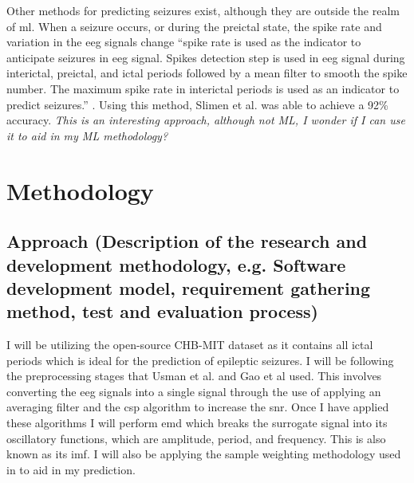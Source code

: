\documentclass[12pt]{article}
\begin{document}
Other methods for predicting seizures exist, although they are outside the realm of \acrshort{ml}. When a seizure occurs, or during the preictal state, the spike rate and variation in the \acrshort{eeg} signals change \cite{lange1983temporo} \cite{truccolo2011single} ``spike rate is used as the indicator to anticipate seizures in \acrfull{eeg} signal. Spikes detection step is used in \acrshort{eeg} signal during interictal, preictal, and ictal periods followed by a mean filter to smooth the spike number. The maximum spike rate in interictal periods is used as an indicator to predict seizures.'' \cite{slimen2020epileptic}. Using this method, Slimen et al. was able to achieve a 92\% accuracy. \textit{This is an interesting approach, although not ML, I wonder if I can use it to aid in my ML methodology?}


\section{Methodology}

\subsection{Approach (Description of the research and development methodology, e.g. Software
development model, requirement gathering method, test and evaluation process)}

I will be utilizing the open-source CHB-MIT dataset \cite{shoeb2009application} \cite{PhysioNet} as it contains all ictal periods which is ideal for the prediction of epileptic seizures. I will be following the preprocessing stages that Usman et al. and Gao et al used. This involves converting the \acrshort{eeg} signals into a single signal through the use of applying an averaging filter and the \acrfull{csp} algorithm to increase the \acrshort{snr}. Once I have applied these algorithms I will perform \acrshort{emd} which breaks the surrogate signal into its oscillatory functions, which are amplitude, period, and frequency. This is also known as its \acrfull{imf}. I will also be applying the sample weighting methodology used in \cite{gao2022general} to aid in my prediction.
\end{document}
